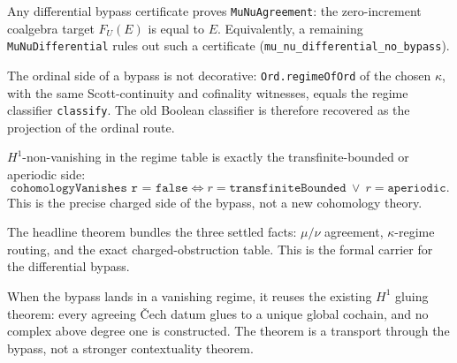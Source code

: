\begin{theorem}\label{thm:differential-bypass-agreement}\leanok{}
Any differential bypass certificate proves \texttt{MuNuAgreement}: the
zero-increment coalgebra target \(F_U(E)\) is equal to \(E\).  Equivalently, a
remaining \texttt{MuNuDifferential} rules out such a certificate
(\texttt{mu\_nu\_differential\_no\_bypass}).
\end{theorem}

\begin{theorem}\label{thm:differential-bypass-regime}\leanok{}
The ordinal side of a bypass is not decorative: \texttt{Ord.regimeOfOrd} of the
chosen \(\kappa\), with the same Scott-continuity and cofinality witnesses,
equals the regime classifier \texttt{classify}.  The old Boolean classifier is
therefore recovered as the projection of the ordinal route.
\end{theorem}

\begin{theorem}\label{thm:obstruction-charged-iff}\leanok{}
\(H^1\)-non-vanishing in the regime table is exactly the
transfinite-bounded or aperiodic side:
\[
  \texttt{cohomologyVanishes r = false}
  \iff
  r=\texttt{transfiniteBounded}\ \vee\ r=\texttt{aperiodic}.
\]
This is the precise charged side of the bypass, not a new cohomology theory.
\end{theorem}

\begin{theorem}\label{thm:differential-bypass-sound}\leanok{}
The headline theorem bundles the three settled facts: \(\mu/\nu\) agreement,
\(\kappa\)-regime routing, and the exact charged-obstruction table.  This is
the formal carrier for the differential bypass.
\end{theorem}

\begin{theorem}\label{thm:differential-bypass-h1-vanishes}\leanok{}
When the bypass lands in a vanishing regime, it reuses the existing \(H^1\)
gluing theorem: every agreeing \v{C}ech datum glues to a unique global cochain,
and no complex above degree one is constructed.  The theorem is a
transport through the bypass, not a stronger contextuality theorem.
\end{theorem}

